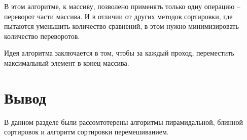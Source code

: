 В этом алгоритме, к массиву, позволено применять только одну операцию – переворот части массива. И в отличии от других методов сортировки, где пытаются уменьшить количество сравнений, в этом нужно минимизировать количество переворотов.

Идея алгоритма заключается в том, чтобы за каждый проход, переместить максимальный элемент в конец массива.

\section*{Вывод}

В данном разделе были рассомтотерены алгоритмы пирамидальной, блинной сортировок
и алгоритм сортировки перемешиванием.
